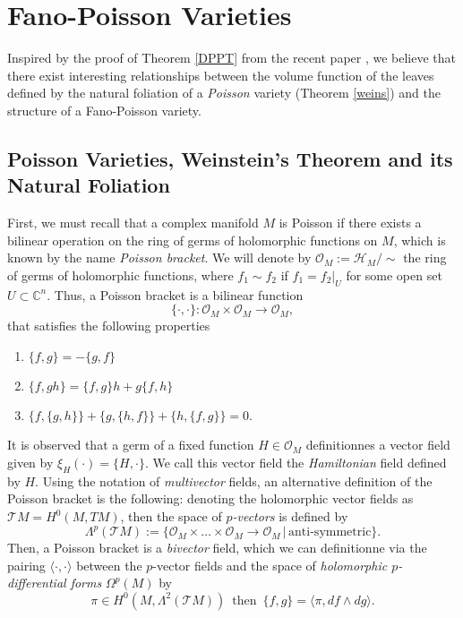 \documentclass[12pt,twoside,a4paper]{report}
\newcommand{\con}{\ensuremath{\mathbb{C}^n}}
\begin{document}
\section{Fano-Poisson Varieties}
\noindent Inspired by the proof of Theorem \ref{DPPT} from the recent paper \cite{DPPT}, we believe that there exist
interesting relationships between the volume function of the leaves defined by the natural foliation of a \emph{Poisson} variety
(Theorem \ref{weins}) and the structure of a Fano-Poisson variety.

\subsection{Poisson Varieties, Weinstein's Theorem and its Natural Foliation}
\noindent First, we must recall that a complex manifold $M$ is Poisson if there exists a bilinear operation on the ring of germs of
holomorphic functions on $M$, which is known by the name \emph{Poisson bracket}.
We will denote by $\mathcal{O}_M:=\mathcal{H}_M/\sim$ the ring of germs of holomorphic functions, where $f_1\sim f_2$ if
$f_1=f_2|_U$ for some open set $U\subset\con$. Thus, a Poisson bracket is a bilinear function
\[
\{\cdot,\cdot\}:\mathcal{O}_M\times\mathcal{O}_M\rightarrow\mathcal{O}_M,
\]
that satisfies the following properties
\begin{enumerate}
\item $\{f,g\} = -\{g,f\}$
\item $\{f,gh\}=\{f,g\}h + g\{f,h\}$
\item $\{f,\{g,h\}\}+\{g,\{h,f\}\} + \{h,\{ f,g\}\}=0$.
\end{enumerate}
\noindent It is observed that a germ of a fixed function $H\in\mathcal{O}_M$ definitionnes a vector field given by $\xi_H(\cdot)=\{H,\cdot\}$.
We call this vector field the \emph{Hamiltonian} field defined by $H$. Using the notation of \emph{multivector} fields,
an alternative definition of the Poisson bracket is the following: denoting the holomorphic vector fields as $\mathcal{T}M=H^0(M,TM)$,
then the space of \emph{$p$-vectors} is defined by
\[
        \Lambda^{p}(\mathcal{T}M):=\{\mathcal{O}_M\times\dots\times\mathcal{O}_M\rightarrow\mathcal{O}_M\,\vert\,\text{anti-symmetric}\}.
\]
Then, a Poisson bracket is a \emph{bivector} field, which we can definitionne via the pairing $\langle\cdot,\cdot\rangle$
between the $p$-vector fields and the space of \emph{holomorphic $p$-differential forms} $\Omega^{p}(M)$ by
\[
        \pi\in H^0(M,\Lambda^2(\mathcal{T}M))\,\text{ then }\,\{f,g\}=\langle \pi,df\wedge dg\rangle.
\]
\end{document}
